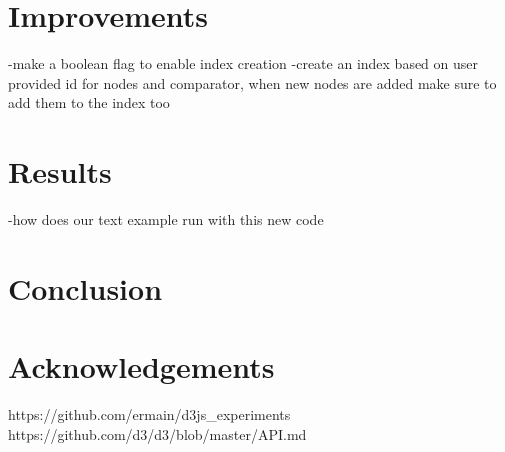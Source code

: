 \documentclass[a4paper]{article}
\begin{document}
\section{Improvements}
-make a boolean flag to enable index creation
-create an index based on user provided id for nodes and comparator, when new nodes are added make sure to add them to the index too
\section{Results}
-how does our text example run with this new code
\section{Conclusion}

\section{Acknowledgements}


\begin{thebibliography}{9}
 https://github.com/ermain/d3js\_experiments
 https://github.com/d3/d3/blob/master/API.md
\end{thebibliography}

\end{document}
